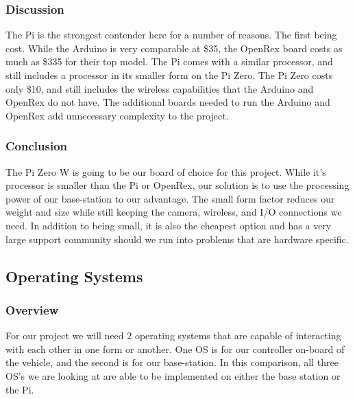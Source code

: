\documentclass[onecolumn, draftclsnofoot,10pt, compsoc]{IEEEtran}
\begin{document}

\subsubsection{Discussion}

The Pi is the strongest contender here for a number of reasons. The 
first being cost. While the Arduino is very comparable at \$35, the 
OpenRex board costs as much as \$335 for their top model. The Pi 
comes with a similar processor, and still includes a processor in 
its smaller form on the Pi Zero. The Pi Zero costs only \$10, and 
still includes the wireless capabilities that the Arduino and 
OpenRex do not have. The additional boards needed to run the 
Arduino and OpenRex add unnecessary complexity to the project. 

\subsubsection{Conclusion}

The Pi Zero W\cite{r3} is going to be our board of choice for this project. 
While it's processor is smaller than the Pi or OpenRex, our 
solution is to use the processing power of our base-station to our 
advantage. The small form factor reduces our weight and size while 
still keeping the camera, wireless, and I/O connections we need. In 
addition to being small, it is also the cheapest option and has a 
very large support community should we run into problems that are 
hardware specific. 





\subsection{Operating Systems}

\subsubsection{Overview}

For our project we will need 2 operating systems that are capable 
of interacting with each other in one form or another. One OS is for 
our controller on-board of the vehicle, and the second is for our 
base-station. In this comparison, all three OS's we are looking at 
are able to be implemented on either the base station or the Pi.  
\end{document}

